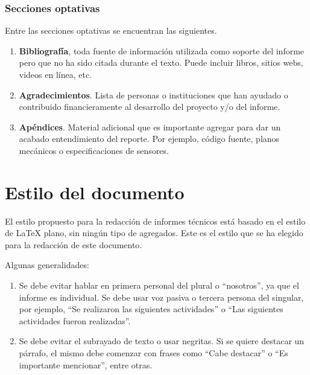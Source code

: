 \documentclass{article}
\begin{document}
\subsubsection{Secciones optativas}

Entre las secciones optativas se encuentran las siguientes.

\begin{enumerate}

    \item \textbf{Bibliografía}, toda fuente de información utilizada como soporte del informe pero que no ha sido citada durante el texto. Puede incluir libros, sitios webs, videos en línea, etc.

    \item \textbf{Agradecimientos}. Lista de personas o instituciones que han ayudado o contribuido financieramente al desarrollo del proyecto y/o del informe.

    \item \textbf{Apéndices}. Material adicional que es importante agregar para dar un acabado entendimiento del reporte. Por ejemplo, código fuente, planos mecánicos o especificaciones de sensores.

\end{enumerate}

\section{Estilo del documento}
\label{sec:estilo}

El estilo propuesto para la redacción de informes técnicos está basado en el estilo de \LaTeX{} plano, sin ningún tipo de agregados. Este es el estilo que se ha elegido para la redacción de este documento.

Algunas generalidades:

\begin{enumerate}

    \item Se debe evitar hablar en primera personal del plural o ``nosotros'', ya que el informe es individual. Se debe usar voz pasiva o tercera persona del singular, por ejemplo, ``Se realizaron las siguientes actividades'' o ``Las siguientes actividades fueron realizadas''.
    
    \item Se debe evitar el subrayado de texto o usar negritas. Si se quiere destacar un párrafo, el mismo debe comenzar con frases como ``Cabe destacar'' o ``Es importante mencionar'', entre otras. 

\end{enumerate}
\end{document}

